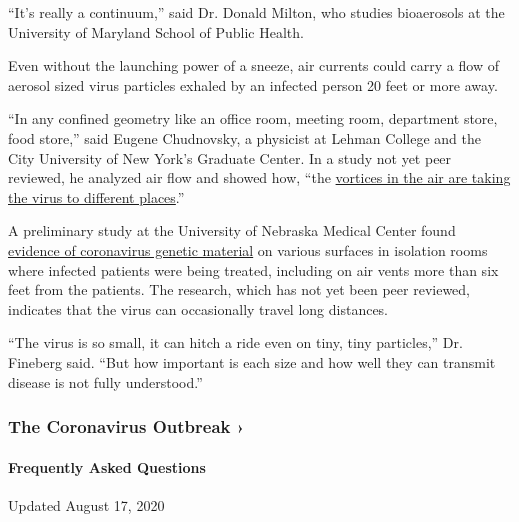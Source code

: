 ``It's really a continuum,'' said Dr. Donald Milton, who studies
bioaerosols at the University of Maryland School of Public Health.

Even without the launching power of a sneeze, air currents could carry a
flow of aerosol sized virus particles exhaled by an infected person 20
feet or more away.

``In any confined geometry like an office room, meeting room, department
store, food store,'' said Eugene Chudnovsky, a physicist at Lehman
College and the City University of New York's Graduate Center. In a
study not yet peer reviewed, he analyzed air flow and showed how, ``the
\href{https://arxiv.org/abs/2003.13689}{vortices in the air are taking
the virus to different places}.''

A preliminary study at the University of Nebraska Medical Center found
\href{https://www.medrxiv.org/content/10.1101/2020.03.23.20039446v2}{evidence
of coronavirus genetic material} on various surfaces in isolation rooms
where infected patients were being treated, including on air vents more
than six feet from the patients. The research, which has not yet been
peer reviewed, indicates that the virus can occasionally travel long
distances.

``The virus is so small, it can hitch a ride even on tiny, tiny
particles,'' Dr. Fineberg said. ``But how important is each size and how
well they can transmit disease is not fully understood.''

\href{https://www.nytimes3xbfgragh.onion/news-event/coronavirus?action=click\&pgtype=Article\&state=default\&region=MAIN_CONTENT_3\&context=storylines_faq}{}

\hypertarget{the-coronavirus-outbreak-}{%
\subsubsection{The Coronavirus Outbreak
›}\label{the-coronavirus-outbreak-}}

\hypertarget{frequently-asked-questions}{%
\paragraph{Frequently Asked
Questions}\label{frequently-asked-questions}}

Updated August 17, 2020

